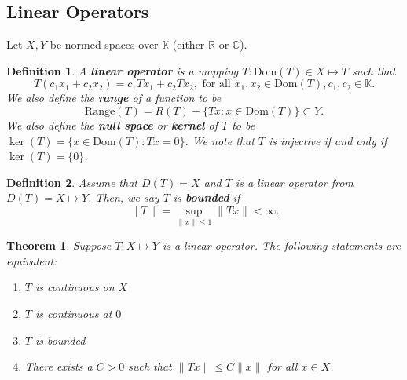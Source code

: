 \documentclass[12pt]{article}
\newtheorem{theorem}{Theorem}
\newtheorem{definition}{Definition}
\newcommand{\R}{{\mathbb R}}
\newcommand{\C}{{\mathbb C}}
\def\K{\mathbb{K}}
\newcommand{\sbs}{\subset}
\begin{document}
\subsection*{Linear Operators}
Let $X, Y$ be normed spaces over $\K$ (either $\R$ or $\C$).
\begin{definition}
A \textbf{linear operator} is a mapping $T: \text{Dom}(T) \in X \mapsto T$ such that 
\[ T(c_1 x_1 + c_2 x_2) = c_1 T x_1 + c_2 T x_2, \text{ for all } x_1, x_2 \in \text{Dom}(T), c_1, c_2 \in \K.\]
We also define the \textbf{range} of a function to be
\[ \text{Range}(T) = R(T) - \{ Tx : x \in \text{Dom}(T) \} \sbs Y.\] 
We also define the \textbf{null space} or \textbf{kernel}  of $T$ to be $\ker(T) = \{ x \in \text{Dom}(T) : Tx = 0 \}$. We note that $T$ is injective if and only if $\ker(T) = \{ 0 \}$.
\end{definition}
\begin{definition}
Assume that $D(T) = X$ and $T$ is a linear operator from $D(T) = X \mapsto Y$. Then, we say $T$ is \textbf{bounded} if 
\[ \| T \| = \sup\limits_{\| x \| \leq 1} \| T x\| < \infty. \]
\end{definition}
\begin{theorem}
Suppose $T: X \mapsto Y$ is a linear operator. The following statements are equivalent:
\begin{enumerate}[topsep=-15pt, itemsep=0pt]
\item[(a)] $T$ is continuous on $X$
\item[(b)] $T$ is continuous at $0$
\item[(c)] $T$ is bounded
\item[(d)] There exists a $C > 0$ such that $\| Tx \| \leq C \| x \|$ for all $x \in X$. 
\end{enumerate}
\end{theorem}
\vspace{-15pt}
\end{document}

